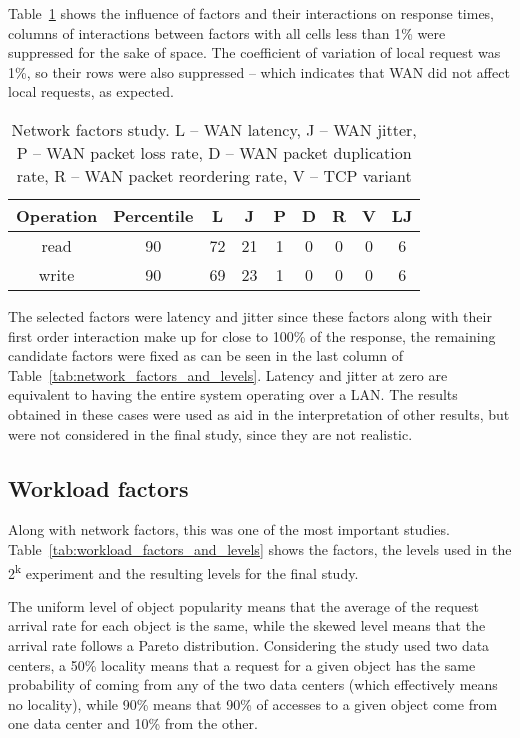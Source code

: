 \documentclass[man,floatsintext,12pt]{apa6}
\begin{document}
Table~\ref{tab:estudo_para_fatores_de_rede} shows the influence of factors and
their interactions on response times, columns of interactions between factors
with all cells less than 1\% were suppressed for the sake of space. The
coefficient of variation of local request was 1\%, so their rows were also
suppressed -- which indicates that WAN did not affect local requests, as
expected.

\begin{table}[h!]
\caption{Network factors study. L -- WAN latency, J -- WAN jitter, P -- WAN
packet loss rate, D -- WAN packet duplication rate, R -- WAN packet reordering
rate, V -- TCP variant}
\begin{tabular}{ccccccccc} \toprule

Operation & Percentile & L & J & P & D & R & V & LJ\\ \midrule

read & 90 & 72 & 21 & 1 & 0 & 0 & 0 & 6\\

write & 90 & 69 & 23 & 1 & 0 & 0 & 0 & 6\\ \bottomrule

\end{tabular}
\label{tab:estudo_para_fatores_de_rede}

\end{table}

The selected factors were latency and jitter since these factors along with
their first order interaction make up for close to 100\% of the response, the
remaining candidate factors were fixed as can be seen in the last column of
Table~\ref{tab:network_factors_and_levels}. Latency and jitter at zero are
equivalent to having the entire system operating over a LAN. The results
obtained in these cases were used as aid in the interpretation of other
results, but were not considered in the final study, since they are not
realistic.

\subsection{Workload factors}

Along with network factors, this was one of the most important studies.
Table~\ref{tab:workload_factors_and_levels} shows the factors, the levels used
in the 2\textsuperscript{k} experiment and the resulting levels for the final
study.

The uniform level of object popularity means that the average of the request
arrival rate for each object is the same, while the skewed level means that the
arrival rate follows a Pareto distribution. Considering the study used two data
centers, a 50\% locality means that a request for a given object has the same
probability of coming from any of the two data centers (which effectively means
no locality), while 90\% means that 90\% of accesses to a given object come
from one data center and 10\% from the other.
\end{document}
